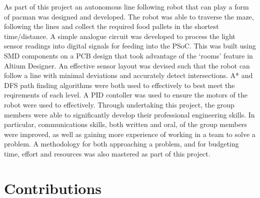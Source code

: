 \documentclass{article}
\begin{document}
As part of this project an autonomous line following robot that can play a form of pacman was designed and developed. The robot was able to traverse the maze, following the lines and collect the required food pallets in the shortest time/distance. A simple analogue circuit was developed to process the light sensor readings into digital signals for feeding into the PSoC. This was built using SMD components on a PCB design that took advantage of the `rooms' feature in Altium Designer. An effective sensor layout was devised such that the robot can follow a line with minimal deviations and accurately detect intersections. A* and DFS path finding algorithms were both used to effectively to best meet the reqirements of each level. A PID contoller was used to ensure the motors of the robot were used to effectively. Through undertaking this project, the group members were able to significantly develop their professional engineering skills. In particular, communications skills, both written and oral, of the group members were improved, as well as gaining more experience of working in a team to solve a problem. A methodology for both approaching a problem, and for budgeting time, effort and resources was also mastered as part of this project.

\clearpage

\section{Contributions}
\end{document}
